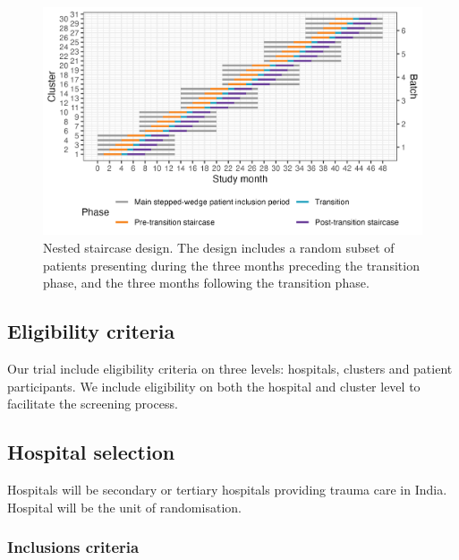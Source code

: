 \documentclass[
]{scrartcl}
\begin{document}
\begin{figure}

{\centering \includegraphics[width=5.9in,height=\textheight]{trial-design-figure-30-clusters-5-sequences-6-batches-6-batches-overlap-4-min-standard-care-4-min-intervention-1-transition-months-0-transition-overlap.3-staircase-months.png}

}

\caption{\label{fig-nested-staircase-design}Nested staircase design. The
design includes a random subset of patients presenting during the three
months preceding the transition phase, and the three months following
the transition phase.}

\end{figure}

\hypertarget{eligibility-criteria}{%
\subsection{Eligibility criteria}\label{eligibility-criteria}}

Our trial include eligibility criteria on three levels: hospitals,
clusters and patient participants. We include eligibility on both the
hospital and cluster level to facilitate the screening process.

\hypertarget{hospital-selection}{%
\subsection{Hospital selection}\label{hospital-selection}}

Hospitals will be secondary or tertiary hospitals providing trauma care
in India. Hospital will be the unit of randomisation.

\hypertarget{inclusions-criteria}{%
\subsubsection{Inclusions criteria}\label{inclusions-criteria}}
\end{document}

